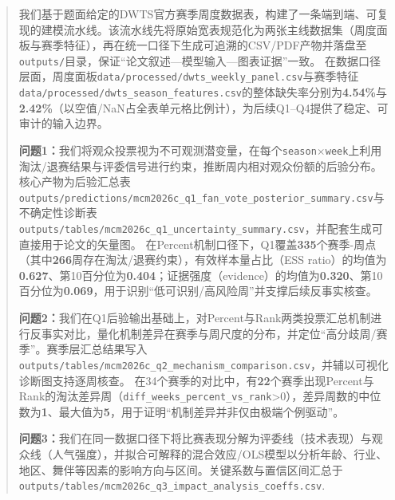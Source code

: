 \begin{abstract}%


	我们基于题面给定的DWTS官方赛季周度数据表，构建了一条端到端、可复现的建模流水线。该流水线先将原始宽表规范化为两张主线数据集（周度面板与赛季特征），再在统一口径下生成可追溯的CSV/PDF产物并落盘至\texttt{outputs/}目录，保证“论文叙述---模型输入---图表证据”一致。
	在数据口径层面，周度面板\texttt{data/processed/dwts\_weekly\_panel.csv}与赛季特征\texttt{data/processed/dwts\_season\_features.csv}的整体缺失率分别为\textbf{4.54\%}与\textbf{2.42\%}（以空值/NaN占全表单元格比例计），为后续Q1--Q4提供了稳定、可审计的输入边界。

	\textbf{问题1：}我们将观众投票视为不可观测潜变量，在每个\texttt{season$\times$week}上利用淘汰/退赛结果与评委信号进行约束，推断周内相对观众份额的后验分布。核心产物为后验汇总表\texttt{outputs/predictions/mcm2026c\_q1\_fan\_vote\_posterior\_summary.csv}与不确定性诊断表\texttt{outputs/tables/mcm2026c\_q1\_uncertainty\_summary.csv}，并配套生成可直接用于论文的矢量图。
	在Percent机制口径下，Q1覆盖\textbf{335}个赛季-周点（其中\textbf{266}周存在淘汰/退赛约束），有效样本量占比（ESS ratio）的均值为\textbf{0.627}、第10百分位为\textbf{0.404}；证据强度（evidence）的均值为\textbf{0.320}、第10百分位为\textbf{0.069}，用于识别“低可识别/高风险周”并支撑后续反事实核查。


	\textbf{问题2：}我们在Q1后验输出基础上，对Percent与Rank两类投票汇总机制进行反事实对比，量化机制差异在赛季与周尺度的分布，并定位“高分歧周/赛季”。赛季层汇总结果写入\texttt{outputs/tables/mcm2026c\_q2\_mechanism\_comparison.csv}，并辅以可视化诊断图支持逐周核查。
	在34个赛季的对比中，有\textbf{22}个赛季出现Percent与Rank的淘汰差异周（\texttt{diff\_weeks\_percent\_vs\_rank}>0），差异周数的中位数为\textbf{1}、最大值为\textbf{5}，用于证明“机制差异并非仅由极端个例驱动”。


	\textbf{问题3：}我们在同一数据口径下将比赛表现分解为评委线（技术表现）与观众线（人气强度），并拟合可解释的混合效应/OLS模型以分析年龄、行业、地区、舞伴等因素的影响方向与区间。关键系数与置信区间汇总于\texttt{outputs/tables/mcm2026c\_q3\_impact\_analysis\_coeffs.csv}.



\end{abstract}
